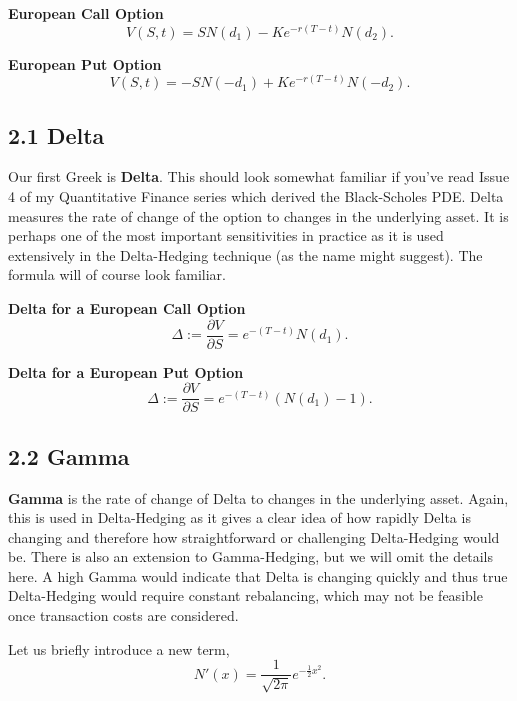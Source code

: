 \documentclass[11pt]{article}
\begin{document}
\newpage

\textbf{European Call Option}
\begin{equation}
    V(S,t) = SN(d_1) - Ke^{-r(T-t)}N(d_2).
\end{equation}

\textbf{European Put Option}
\begin{equation}
    V(S,t) = -SN(-d_1) + Ke^{-r(T-t)}N(-d_2).
\end{equation}

\subsection*{2.1 Delta}
Our first Greek is \textbf{Delta}. This should look somewhat familiar if you've read Issue 4 of my Quantitative Finance series which derived the Black-Scholes PDE. Delta measures the rate of change of the option to changes in the underlying asset. It is perhaps one of the most important sensitivities in practice as it is used extensively in the Delta-Hedging technique (as the name might suggest). The formula will of course look familiar. 

\textbf{Delta for a European Call Option}
\begin{equation}
    \Delta := \frac{\partial V}{\partial S} = e^{-(T-t)}N(d_1).
\end{equation}

\textbf{Delta for a European Put Option}
\begin{equation}
    \Delta := \frac{\partial V}{\partial S} = e^{-(T-t)}( N(d_1) - 1).
\end{equation}

\subsection*{2.2 Gamma}
\textbf{Gamma} is the rate of change of Delta to changes in the underlying asset. Again, this is used in Delta-Hedging as it gives a clear idea of how rapidly Delta is changing and therefore how straightforward or challenging Delta-Hedging would be. There is also an extension to Gamma-Hedging, but we will omit the details here. 
A high Gamma would indicate that Delta is changing quickly and thus true Delta-Hedging would require constant rebalancing, which may not be feasible once transaction costs are considered. 

Let us briefly introduce a new term,
\begin{equation}
    N'(x) = \frac{1}{\sqrt{2 \pi}} e^{-\frac{1}{2}x^2}.
\end{equation}
\end{document}
